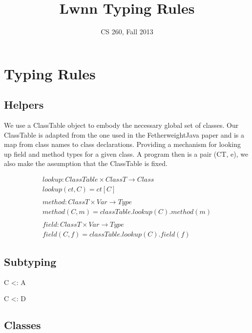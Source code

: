 \documentclass[10pt]{article}
\begin{document}
\title{\textbf{\textsf{Lwnn}} Typing Rules}
\author{CS 260, Fall 2013}
\date{}
\maketitle

\newcommand{\env}{\Gamma \vdash}
\newcommand{\classK}{\textbf{class}}
\newcommand{\extends}{\textbf{extends}}
\newcommand{\fields}{\textbf{fields}}
\newcommand{\bop}{\oplus}

\section{Typing Rules}
\subsection{Helpers}
We use a ClassTable object to embody the necessary global set of classes. Our ClassTable is adapted from the one used in the 
FetherweightJava paper and is a map from class names to class declarations. Providing a mechanism for looking up field and 
method types for a given class.  A program then is a pair (CT, e), we also make the assumption that the ClassTable is fixed.

\begin{align*}
lookup : ClassTable \times ClassT \to Class
\\
lookup(ct, C) = ct[C]
\\\\
method : ClassT \times Var \to Type
\\
method(C, m) = classTable.lookup(C).method(m)
\\\\
field : ClassT \times Var \to Type
\\
field(C, f) = classTable.lookup(C).field(f)
\end{align*}

\subsection{Subtyping}


{ C  <: A }

{ C <: D }

\subsection{Classes}
\infrule[T-Class]{ \env }{ todo }
\end{document}
